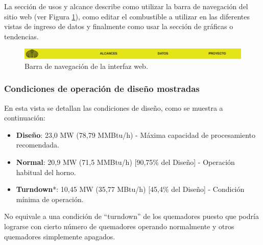 \par La sección de usos y alcance describe como utilizar la barra de navegación del sitio web (ver Figura \ref{fig:navbar}), como editar el combustible a utilizar en las diferentes vistas de ingreso de datos y finalmente como usar la sección de gráficas o tendencias.
\begin{figure}[H]
\begin{center}
\includegraphics[scale=0.22]{images/navbar}
\caption[Barra de navegación]{Barra de navegación de la interfaz web.}
\label{fig:navbar}
\end{center}
\end{figure}

\subsubsection{Condiciones de operación de diseño mostradas}
\par En esta vista se detallan las condiciones de diseño, como se muestra a continuación:
\begin{itemize}
    \item \textbf{Diseño}: 23,0 MW (78,79 MMBtu/h) - Máxima capacidad de procesamiento recomendada.
    \item \textbf{Normal}: 20,9 MW (71,5 MMBtu/h) [90,75\% del Diseño] - Operación habitual del horno.
    \item \textbf{Turndown}*: 10,45 MW (35,77 MBtu/h) [45,4\% del Diseño] - Condición mínima de operación.
\end{itemize}
\par *No equivale a una condición de ``turndown'' de los quemadores puesto que podría lograrse con cierto número de quemadores operando normalmente y otros quemadores simplemente apagados.

